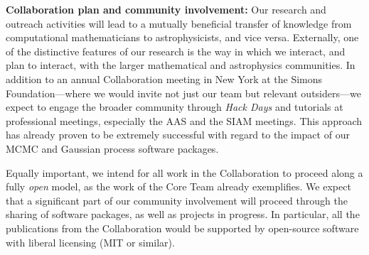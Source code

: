 \documentclass[11pt]{article}
\renewcommand{\paragraph}[1]{\smallskip\par\noindent\textbf{{#1}:}}
\begin{document}
\paragraph{Collaboration plan and community involvement}
Our research and outreach activities will lead to a mutually beneficial
transfer of knowledge from computational mathematicians to
astrophysicists, and vice versa.
Externally, one of the distinctive features of our research is the way
in which we interact, and plan to interact, with the larger mathematical
and astrophysics communities.
In addition to an annual Collaboration meeting in New York at the Simons
Foundation---where we would invite not just our team but relevant
outsiders---we expect to engage the broader community through \emph{Hack
Days} and tutorials at professional meetings, especially the AAS and the 
SIAM meetings.
This approach has already proven to be extremely successful with regard
to the impact of our MCMC and Gaussian process software packages.

Equally important, we intend for all work in the Collaboration to
proceed along a fully \emph{open} model, as the work of the Core Team
already exemplifies.
We expect that a significant part of our community involvement will
proceed through the sharing of software packages, as well as projects in
progress.
In particular, all the publications from the Collaboration would be
supported by open-source software with liberal licensing (MIT or similar).
\end{document}
